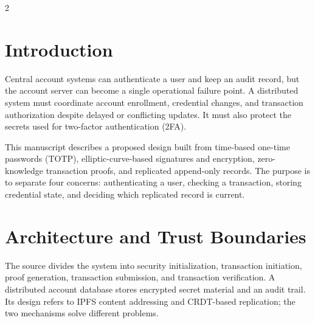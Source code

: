 \documentclass[10pt,letterpaper]{article}
\newcommand{\figstep}[1]{\tikz[baseline=(X.base)]\node[draw=black!55,rounded corners=2pt,fill=black!3,inner sep=5pt,text width=0.85\columnwidth,align=center,minimum height=0.34in] (X) {\footnotesize #1};}
\begin{document}
\begin{multicols}{2}

\section{Introduction}
Central account systems can authenticate a user and keep an audit record, but the account server can become a single operational failure point. A distributed system must coordinate account enrollment, credential changes, and transaction authorization despite delayed or conflicting updates. It must also protect the secrets used for two-factor authentication (2FA).

This manuscript describes a proposed design built from time-based one-time passwords (TOTP), elliptic-curve-based signatures and encryption, zero-knowledge transaction proofs, and replicated append-only records. The purpose is to separate four concerns: authenticating a user, checking a transaction, storing credential state, and deciding which replicated record is current.

\section{Architecture and Trust Boundaries}
The source divides the system into security initialization, transaction initiation, proof generation, transaction submission, and transaction verification. A distributed account database stores encrypted secret material and an audit trail. Its design refers to IPFS content addressing and CRDT-based replication; the two mechanisms solve different problems.

\begin{center}
\begin{minipage}{\columnwidth}
\centering
{}
\end{minipage}
\end{center}


\end{multicols}
\end{document}
